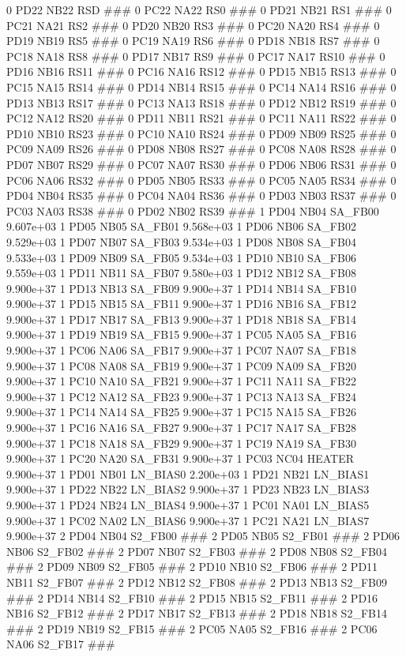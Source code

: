 0 PD22 NB22 RSD ### 
0 PC22 NA22 RS0 ### 
0 PD21 NB21 RS1 ### 
0 PC21 NA21 RS2 ### 
0 PD20 NB20 RS3 ### 
0 PC20 NA20 RS4 ### 
0 PD19 NB19 RS5 ### 
0 PC19 NA19 RS6 ### 
0 PD18 NB18 RS7 ### 
0 PC18 NA18 RS8 ### 
0 PD17 NB17 RS9 ### 
0 PC17 NA17 RS10 ### 
0 PD16 NB16 RS11 ### 
0 PC16 NA16 RS12 ### 
0 PD15 NB15 RS13 ### 
0 PC15 NA15 RS14 ### 
0 PD14 NB14 RS15 ### 
0 PC14 NA14 RS16 ### 
0 PD13 NB13 RS17 ### 
0 PC13 NA13 RS18 ### 
0 PD12 NB12 RS19 ### 
0 PC12 NA12 RS20 ### 
0 PD11 NB11 RS21 ### 
0 PC11 NA11 RS22 ### 
0 PD10 NB10 RS23 ### 
0 PC10 NA10 RS24 ### 
0 PD09 NB09 RS25 ### 
0 PC09 NA09 RS26 ### 
0 PD08 NB08 RS27 ### 
0 PC08 NA08 RS28 ### 
0 PD07 NB07 RS29 ### 
0 PC07 NA07 RS30 ### 
0 PD06 NB06 RS31 ### 
0 PC06 NA06 RS32 ### 
0 PD05 NB05 RS33 ### 
0 PC05 NA05 RS34 ### 
0 PD04 NB04 RS35 ### 
0 PC04 NA04 RS36 ### 
0 PD03 NB03 RS37 ### 
0 PC03 NA03 RS38 ### 
0 PD02 NB02 RS39 ### 
1 PD04 NB04 SA_FB00 9.607e+03 
1 PD05 NB05 SA_FB01 9.568e+03 
1 PD06 NB06 SA_FB02 9.529e+03 
1 PD07 NB07 SA_FB03 9.534e+03 
1 PD08 NB08 SA_FB04 9.533e+03 
1 PD09 NB09 SA_FB05 9.534e+03 
1 PD10 NB10 SA_FB06 9.559e+03 
1 PD11 NB11 SA_FB07 9.580e+03 
1 PD12 NB12 SA_FB08 9.900e+37 
1 PD13 NB13 SA_FB09 9.900e+37 
1 PD14 NB14 SA_FB10 9.900e+37 
1 PD15 NB15 SA_FB11 9.900e+37 
1 PD16 NB16 SA_FB12 9.900e+37 
1 PD17 NB17 SA_FB13 9.900e+37 
1 PD18 NB18 SA_FB14 9.900e+37 
1 PD19 NB19 SA_FB15 9.900e+37 
1 PC05 NA05 SA_FB16 9.900e+37 
1 PC06 NA06 SA_FB17 9.900e+37 
1 PC07 NA07 SA_FB18 9.900e+37 
1 PC08 NA08 SA_FB19 9.900e+37 
1 PC09 NA09 SA_FB20 9.900e+37 
1 PC10 NA10 SA_FB21 9.900e+37 
1 PC11 NA11 SA_FB22 9.900e+37 
1 PC12 NA12 SA_FB23 9.900e+37 
1 PC13 NA13 SA_FB24 9.900e+37 
1 PC14 NA14 SA_FB25 9.900e+37 
1 PC15 NA15 SA_FB26 9.900e+37 
1 PC16 NA16 SA_FB27 9.900e+37 
1 PC17 NA17 SA_FB28 9.900e+37 
1 PC18 NA18 SA_FB29 9.900e+37 
1 PC19 NA19 SA_FB30 9.900e+37 
1 PC20 NA20 SA_FB31 9.900e+37 
1 PC03 NC04 HEATER 9.900e+37 
1 PD01 NB01 LN_BIAS0 2.200e+03 
1 PD21 NB21 LN_BIAS1 9.900e+37 
1 PD22 NB22 LN_BIAS2 9.900e+37 
1 PD23 NB23 LN_BIAS3 9.900e+37 
1 PD24 NB24 LN_BIAS4 9.900e+37 
1 PC01 NA01 LN_BIAS5 9.900e+37 
1 PC02 NA02 LN_BIAS6 9.900e+37 
1 PC21 NA21 LN_BIAS7 9.900e+37 
2 PD04 NB04 S2_FB00 ### 
2 PD05 NB05 S2_FB01 ### 
2 PD06 NB06 S2_FB02 ### 
2 PD07 NB07 S2_FB03 ### 
2 PD08 NB08 S2_FB04 ### 
2 PD09 NB09 S2_FB05 ### 
2 PD10 NB10 S2_FB06 ### 
2 PD11 NB11 S2_FB07 ### 
2 PD12 NB12 S2_FB08 ### 
2 PD13 NB13 S2_FB09 ### 
2 PD14 NB14 S2_FB10 ### 
2 PD15 NB15 S2_FB11 ### 
2 PD16 NB16 S2_FB12 ### 
2 PD17 NB17 S2_FB13 ### 
2 PD18 NB18 S2_FB14 ### 
2 PD19 NB19 S2_FB15 ### 
2 PC05 NA05 S2_FB16 ### 
2 PC06 NA06 S2_FB17 ### 
